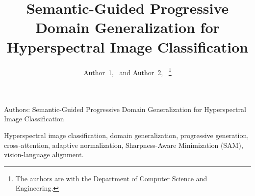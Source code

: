 \documentclass[journal]{IEEEtran}
\begin{document}
\title{Semantic-Guided Progressive Domain Generalization for Hyperspectral Image Classification}

\author{Author~1,~ and Author~2,~%
\thanks{The authors are with the Department of Computer Science and Engineering.}
}

%
{Authors: Semantic-Guided Progressive Domain Generalization for Hyperspectral Image Classification}

\maketitle



\begin{IEEEkeywords}
Hyperspectral image classification, domain generalization, progressive generation, cross-attention, adaptive normalization, Sharpness-Aware Minimization (SAM), vision-language alignment.
\end{IEEEkeywords}













\end{document}

